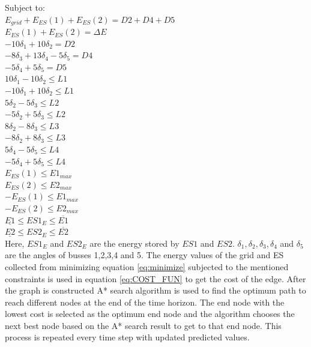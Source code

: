 \documentclass[journal]{IEEEtran}
\begin{document}
Subject to: \\
$E_{grid}+ E_{ES}(1)+E_{ES}(2) = D2+D4+D5$ \\
$E_{ES}(1)+E_{ES}(2) = \Delta E$ \\
$-10 \delta_1 + 10 \delta_2 = D2$\\
$-8 \delta_3 + 13 \delta_4 - 5\delta_5 = D4$\\
$-5 \delta_4 + 5 \delta_5 = D5$\\
$10 \delta_1 - 10 \delta_2 \leq L1$\\
$-10 \delta_1 + 10 \delta_2 \leq L1$\\
$5 \delta_2 - 5 \delta_3 \leq L2$\\
$-5 \delta_2 + 5 \delta_3 \leq L2$\\
$8 \delta_2 - 8 \delta_3 \leq L3$\\
$-8 \delta_2 + 8 \delta_3 \leq L3$\\
$5 \delta_4 - 5\delta_5 \leq L4$\\
$-5 \delta_4 + 5\delta_5 \leq L4$\\
$E_{ES}(1) \leq E1_{max}$\\
$E_{ES}(2) \leq E2_{max}$\\
$-E_{ES}(1) \leq E1_{max}$\\
$-E_{ES}(2) \leq E2_{max}$\\
$\underline{E1} \leq ES1_E \leq \overline{E1}$\\
$\underline{E2} \leq ES2_E \leq \overline{E2}$\\

Here, $ES1_E$ and $ES2_E$ are the energy stored by $ES1$ and $ES2$. $\delta_1, \delta_2, \delta_3, \delta_4$ and $\delta_5$ are the angles of busses 1,2,3,4 and 5. The energy values of the grid and ES collected from minimizing equation \ref{eq:minimize} subjected to the mentioned constraints is used in equation \ref{eq:COST_FUN} to get the cost of the edge. After the graph is constructed A* search algorithm is used to find the optimum path to reach different nodes at the end of the time horizon. The end node with the lowest cost is selected as the optimum end node and the algorithm chooses the next best node based on the A* search result to get to that end node. This process is repeated every time step with updated predicted values.




\end{document}
